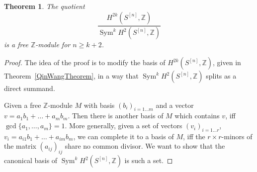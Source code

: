 \documentclass{amsart}
\DeclareMathOperator{\Sym}{Sym}
\newcommand{\hilb}[1]{^{[#1]}}
\newcommand{\IZ}{\mathbb{Z}}
\theoremstyle{plain}
\newtheorem{theorem}{Theorem}[section]
\theoremstyle{definition}
\theoremstyle{remark}
\begin{document}
\begin{theorem}\label{freeness}
The quotient
$$
 \frac{H^{2k}(S\hilb{n},\IZ)}{\Sym^k H^{2}(S\hilb{n},\IZ)}
$$
is a free $\IZ$-module for $n\geq k+2$.
\end{theorem}
\begin{proof}
The idea of the proof is to modify the basis of $H^{2k}(S\hilb{n},\IZ)$, given in Theorem~\ref{QinWangTheorem}, in a way that $\Sym^k H^{2}(S\hilb{n},\IZ)$ splits as a direct summand. 

Given a free $\IZ$-module $M$ with basis $(b_i)_{i=1\ldots m}$ and a vector $v = a_1b_1 + \ldots + a_mb_m$. Then there is another basis of $M$ which contains $v$, iff $\gcd\{a_1,\ldots,a_m\} = 1$. More generally, given a set of vectors $(v_i)_{i=1\ldots r}$, $v_i=a_{i1}b_1+\ldots+a_{im}b_m$, we can complete it to a basis of $M$, iff the $r\times r$-minors of the matrix $(a_{ij})_{ij}$ share no common divisor. We want to show that the canonical basis of $\Sym^k H^{2}(S\hilb{n},\IZ)$ is such a set.


\end{proof}
\end{document}
